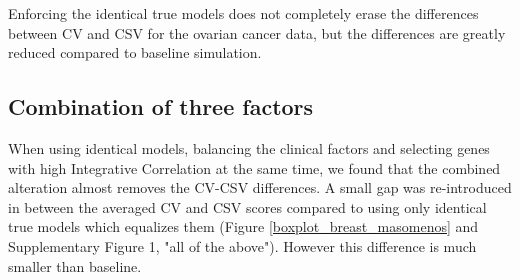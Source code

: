 \documentclass{bioinfo}
\newcommand{\fixme}[1]{\textsl{\textcolor{red}{FIXME: #1}}}
\begin{document}
  Enforcing the identical true models does not completely erase the differences between CV
  and CSV for the ovarian cancer data, but the differences are greatly reduced 
  compared to baseline simulation.
  
   


  \subsection{Combination of three factors}


	When using identical models, balancing the clinical factors
	and selecting genes with high Integrative Correlation at the same time, 
	we found that the combined alteration almost removes the CV-CSV differences. 
	A small gap was re-introduced in between the averaged CV and CSV scores 
	compared to using only identical true models which equalizes them 
	(Figure \ref{boxplot_breast_masomenos} and Supplementary Figure 1, "all of the above"). However this difference is much smaller than	baseline. 
	
\end{document}
